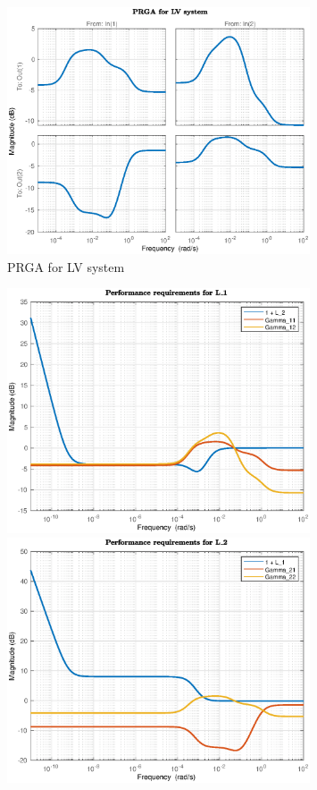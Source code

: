 \documentclass[12pt]{article}
\begin{document}
\begin{figure}[p]
\centering
\includegraphics[width=0.8\textwidth]{../Systemanalyse/Log_Data_to_Matlab/Figurer/LV_identifisering/LV_PRGA.eps}
\caption{PRGA for LV system}
\label{fig:LV_PRGA}
\end{figure}

\begin{figure}[p]
\centering
\includegraphics[width=0.8\textwidth]{../Systemanalyse/Log_Data_to_Matlab/Figurer/LV_identifisering/L1_krav_P-reg.eps}
\caption{}
\label{fig:L1_performance1}

\includegraphics[width=0.8\textwidth]{../Systemanalyse/Log_Data_to_Matlab/Figurer/LV_identifisering/L2_krav_P-reg.eps}
\caption{}
\label{fig:L2_performance1}
\end{figure}
\end{document}

